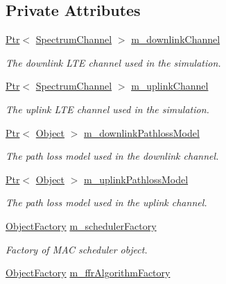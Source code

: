 \subsection*{Private Attributes}
\begin{DoxyCompactItemize}
\item 
\hyperlink{classns3_1_1Ptr}{Ptr}$<$ \hyperlink{classns3_1_1SpectrumChannel}{Spectrum\+Channel} $>$ \hyperlink{classns3_1_1LteHelper_a5c2237946550d801d80c0d0bee0b4cfb}{m\+\_\+downlink\+Channel}
\begin{DoxyCompactList}\small\item\em The downlink L\+TE channel used in the simulation. \end{DoxyCompactList}\item 
\hyperlink{classns3_1_1Ptr}{Ptr}$<$ \hyperlink{classns3_1_1SpectrumChannel}{Spectrum\+Channel} $>$ \hyperlink{classns3_1_1LteHelper_ad61b21e2f55749e680942016b2e57abe}{m\+\_\+uplink\+Channel}
\begin{DoxyCompactList}\small\item\em The uplink L\+TE channel used in the simulation. \end{DoxyCompactList}\item 
\hyperlink{classns3_1_1Ptr}{Ptr}$<$ \hyperlink{classns3_1_1Object}{Object} $>$ \hyperlink{classns3_1_1LteHelper_ab60aa166b387a0ed56d54ff7db31b0f0}{m\+\_\+downlink\+Pathloss\+Model}
\begin{DoxyCompactList}\small\item\em The path loss model used in the downlink channel. \end{DoxyCompactList}\item 
\hyperlink{classns3_1_1Ptr}{Ptr}$<$ \hyperlink{classns3_1_1Object}{Object} $>$ \hyperlink{classns3_1_1LteHelper_a0b121aecc2a13aab12908c8547ba336b}{m\+\_\+uplink\+Pathloss\+Model}
\begin{DoxyCompactList}\small\item\em The path loss model used in the uplink channel. \end{DoxyCompactList}\item 
\hyperlink{classns3_1_1ObjectFactory}{Object\+Factory} \hyperlink{classns3_1_1LteHelper_a22e061dea6e6e1236216ced92bbfb3f2}{m\+\_\+scheduler\+Factory}
\begin{DoxyCompactList}\small\item\em Factory of M\+AC scheduler object. \end{DoxyCompactList}\item 
\hyperlink{classns3_1_1ObjectFactory}{Object\+Factory} \hyperlink{classns3_1_1LteHelper_a26739b9eded6b728e7fe5077db758764}{m\+\_\+ffr\+Algorithm\+Factory}

\end{DoxyCompactItemize}
